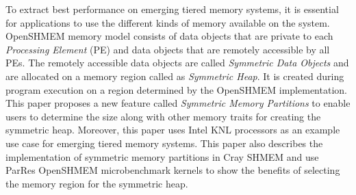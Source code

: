 To extract best performance on emerging tiered memory systems,
it is essential for applications to use the different kinds of
memory available on the system. OpenSHMEM memory model consists of
data objects that are private to each \emph{Processing Element}
(PE) and data objects that are remotely accessible by all PEs. The
remotely accessible data objects are called \emph{Symmetric Data
Objects} and are allocated on a memory region called as
\emph{Symmetric Heap}. It is created during program execution
on a region determined by the OpenSHMEM implementation. This paper
proposes a new feature called \emph{Symmetric Memory Partitions} to
enable users to determine the size along with other memory traits
for creating the symmetric heap. Moreover, this paper uses Intel KNL
processors
as an example use case for emerging tiered memory systems. This paper
also describes the implementation of symmetric memory partitions in
Cray SHMEM and use ParRes OpenSHMEM microbenchmark kernels to
show the benefits of selecting the memory region for the symmetric
heap.


